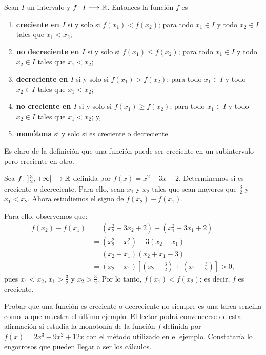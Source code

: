 \begin{defical}
Sean $I$ un intervalo y $f\colon I\longrightarrow \mathbb{R}$. Entonces la función $f$ es
\begin{enumerate}
\item \textbf{creciente en $I$} si y solo si
    $
      f(x_1) < f(x_2)
    $; para todo $x_1 \in I$ y todo $x_2 \in I$ tales que $x_1 < x_2$;
      
\item \textbf{no decreciente en $I$} si y solo si
    $
      f(x_1) \leq f(x_2)
    $; para todo $x_1 \in I$ y todo $x_2 \in I$ tales que $x_1 < x_2$;

\item \textbf{decreciente en $I$} si y solo si
    $
      f(x_1) > f(x_2)
    $; para todo $x_1 \in I$ y todo $x_2 \in I$ tales que $x_1 < x_2$;

\item \textbf{no creciente en $I$} si y solo si
    $
      f(x_1) \geq f(x_2)
    $; para todo $x_1 \in I$ y todo $x_2 \in I$ tales que $x_1 < x_2$; y,

\item \textbf{monótona} si y solo si es creciente o decreciente.
\end{enumerate}
\end{defical}

Es claro de la definición que una función puede ser creciente en un subintervalo pero creciente en
otro.

\begin{exemplo}[]{}
Sea $f\colon ]\frac{3}{2},+\infty [\longrightarrow \mathbb{R}$ definida por $f(x) = x^2 - 3x + 2$. Determinemos si es
creciente o decreciente. Para ello, sean $x_1$ y $x_2$ tales que sean mayores que $\frac{3}{2}$ y
$x_1 < x_2$. Ahora estudiemos el signo de $f(x_2) - f(x_1)$.

Para ello, observemos que:
\begin{align*}
f(x_2) - f(x_1) &= (x_2^2 - 3x_2 + 2) - (x_1^2 - 3x_1 + 2) \\
  &= (x_2^2 - x_1^2) - 3(x_2 - x_1) \\
  &= (x_2 - x_1)(x_2 + x_1 - 3) \\
  &= (x_2 - x_1)[(x_2 - \frac{3}{2}) + (x_1 - \frac{3}{2})] > 0,
\end{align*}
pues $x_1 < x_2$, $x_1 > \frac{3}{2}$ y $x_2 > \frac{3}{2}$. Por lo tanto, $f(x_1) < f(x_2)$; es
decir, $f$ es creciente.
\end{exemplo}

Probar que una función es creciente o decreciente no siempre es una tarea sencilla como la que
muestra el último ejemplo. El lector podrá convencerse de esta afirmación si estudia la monotonía
de la función $f$ definida por $f(x) = 2x^3 - 9x^2 + 12x$ con el método utilizado en el ejemplo.
Constataría lo engorrosos que pueden llegar a ser los cálculos.

